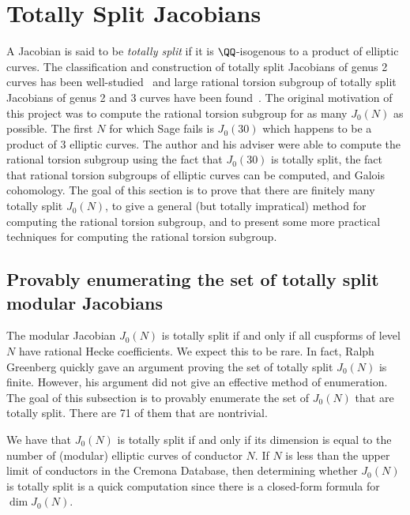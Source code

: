 \documentclass{article}
\begin{document}
\section{Totally Split Jacobians}%
\label{sec:totally_split}

A Jacobian is said to be \emph{totally split} if it is $\QQ$-isogenous to a
product of elliptic curves. The classification and construction of totally
split Jacobians of genus 2 curves has been
well-studied~\cite{bruin-doerksen:split_genus_two,kuhn:split_genus_two}
and large rational torsion subgroup of totally split Jacobians of genus 2 and 3
curves have been found~\cite{howe-leprevost-poonen:large}. The original
motivation of this project was to compute the rational torsion subgroup for as
many $J_0(N)$ as possible. The first $N$ for which Sage fails is $J_0(30)$
which happens to be a product of 3 elliptic curves. The author and his adviser
were able to compute the rational torsion subgroup using the fact that
$J_0(30)$ is totally split, the fact that rational torsion subgroups of
elliptic curves can be computed, and Galois cohomology. The goal of this
section is to prove that there are finitely many totally split $J_0(N)$, to
give a general (but totally impratical) method for computing the rational
torsion subgroup, and to present some more practical techniques for computing
the rational torsion subgroup. 



\subsection{Provably enumerating the set of totally split modular Jacobians}

The modular Jacobian $J_0(N)$ is totally split if and only if all cuspforms of
level $N$ have rational Hecke coefficients. We expect this to be rare. In fact,
Ralph Greenberg quickly gave an argument proving the set of totally split
$J_0(N)$ is finite. However, his argument did not give an effective method of
enumeration. The goal of this subsection is to provably enumerate the set of
$J_0(N)$ that are totally split. There are 71 of them that are nontrivial.

We have that $J_0(N)$ is totally split if and only if its dimension is equal to
the number of (modular) elliptic curves of conductor $N$. If $N$ is less than
the upper limit of conductors in the Cremona Database, then determining whether
$J_0(N)$ is totally split is a quick computation since there is a closed-form
formula for $\dim J_0(N)$.  
\end{document}
